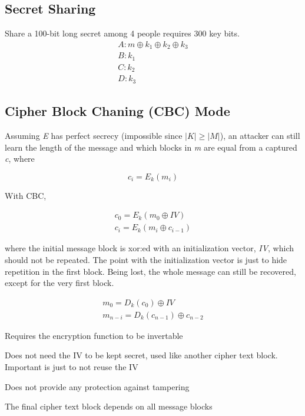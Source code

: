 \documentclass[12pt]{article}
\begin{document}
\subsection{Secret Sharing}

Share a 100-bit long secret among 4 people requires 300 key bits.
\begin{equation}
\begin{split}
A: m \oplus k_1 \oplus k_2 \oplus k_3 \\
B: k_1 \\
C: k_2 \\
D: k_3
\end{split}
\end{equation}
 
\subsection*{Cipher Block Chaning (CBC) Mode}

Assuming \emph{E} has perfect secrecy (impossible since $|K| \ge |M|$), an attacker can still learn the length of the message and which blocks in \emph{m} are equal from a captured \emph{c}, where

\begin{equation}
c_i = E_k(m_i)
\end{equation}

With CBC, 

\begin{equation}
\begin{split}
c_0 = E_k(m_0 \oplus IV) \\
c_i = E_k(m_i \oplus c_{i-1})
\end{split}
\end{equation}

where the initial message block is xor:ed with an initialization vector, \emph{IV}, which should not be repeated. The point with the initialization vector is just to hide repetition in the first block. Being lost, the whole message can still be recovered, except for the very first block.

\begin{equation}
\begin{split}
m_0 = D_k(c_0) \oplus IV \\
m_{n-i} = D_k(c_{n-1}) \oplus c_{n-2}
\end{split}
\end{equation}

\begin{list}{*}{
\setlength{\itemsep}{0pt}
\setlength{\parsep}{0pt}
\setlength{\topsep}{0pt}
\setlength{\partopsep}{0pt}
\setlength{\leftmargin}{2em}
\setlength{\labelwidth}{1.5em}
\setlength{\labelsep}{0.5em}
}
\item Requires the encryption function to be invertable
\item Does not need the IV to be kept secret, used like another cipher text block. Important is just to not reuse the IV
\item Does not provide any protection against tampering
\item The final cipher text block depends on all message blocks
\end{list}
\end{document}
